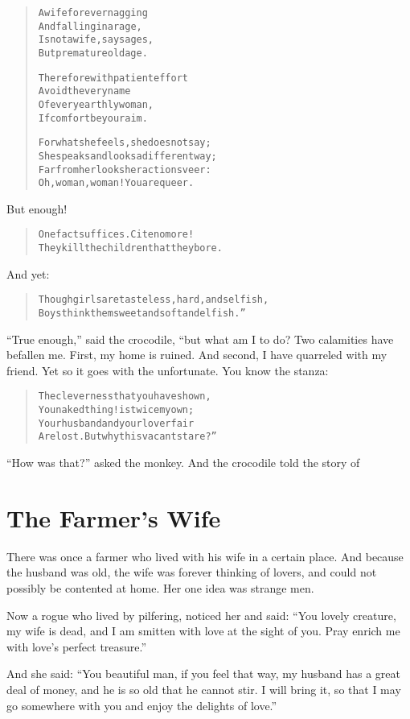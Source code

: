 \documentclass[article, twoside, 14pt]{memoir}
\renewenvironment{verbatim}{%
\begin{quote}%
\vskip -10pt%
\begin{alltt}\normalfont\large}{\end{alltt}%
\end{quote}%
\vskip -10pt
} %
\begin{document}
\begin{verbatim}
A wife forever nagging
    And falling in a rage,
Is not a wife, say sages,
    But premature old age.

Therefore with patient effort
    Avoid the very name
Of every earthly woman,
    If comfort be your aim.

For what she feels, she does not say;
She speaks and looks a different way;
Far from her looks her actions veer:
Oh, woman, woman! You are queer.
\end{verbatim}
But enough!

\begin{verbatim}
One fact suffices. Cite no more!
They kill the children that they bore.
\end{verbatim}
And yet:

\begin{verbatim}
Though girls are tasteless, hard, and selfish,
Boys think them sweet and soft and elfish.”
\end{verbatim}
``True enough,'' said the crocodile, “but what am I to do? Two
calamities have befallen me. First, my home is ruined. And second,
I have quarreled with my friend. Yet so it goes with the
unfortunate. You know the stanza:

\begin{verbatim}
The cleverness that you have shown,
You naked thing! is twice my own;
Your husband and your lover fair
Are lost. But why this vacant stare?”
\end{verbatim}
``How was that?'' asked the monkey. And the crocodile told the
story of

\chapter{The Farmer's Wife}

\label{s74}

There was once a farmer who lived with his wife in a certain
place. And because the husband was old, the wife was forever
thinking of lovers, and could not possibly be contented at home.
Her one idea was strange men.

Now a rogue who lived by pilfering, noticed her and said:
``You lovely creature, my wife is dead, and I am smitten with love at the sight of you. Pray enrich me with love's perfect treasure.''

And she said:
``You beautiful man, if you feel that way, my husband has a great deal of money, and he is so old that he cannot stir. I will bring it, so that I may go somewhere with you and enjoy the delights of love.''
\end{document}
